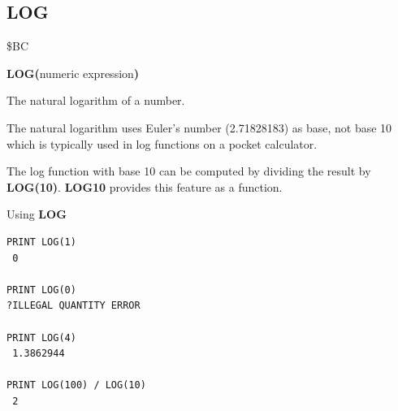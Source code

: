 \subsection{LOG}
\begin{description}[leftmargin=2cm,style=nextline]
\item [Token:]    \$BC

\item [Format:]   {\bf LOG(}numeric expression{\bf)}

\item [Returns:]  The natural logarithm of a number.

                  The natural logarithm uses Euler's number (2.71828183) as base, not base 10 which is typically used in log functions on a pocket calculator.

\item [Remarks:]  The log function with base 10 can be computed by dividing the result by {\bf LOG(10)}. {\bf LOG10} provides this feature as a function.

\item [Examples:] Using {\bf LOG}

\begin{tcolorbox}[colback=black,coltext=white]
\verbatimfont{\codefont}
\begin{verbatim}
PRINT LOG(1)
 0

PRINT LOG(0)
?ILLEGAL QUANTITY ERROR

PRINT LOG(4)
 1.3862944

PRINT LOG(100) / LOG(10)
 2
\end{verbatim}
\end{tcolorbox}
\end{description}


\newpage
